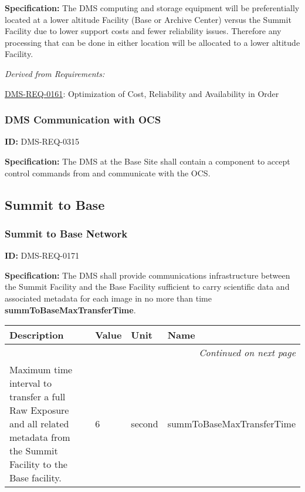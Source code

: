 \documentclass[SE,toc,lsstdraft]{lsstdoc}
\makeatletter
\newcommand{\paramname}[1]{\hspace{0pt}#1}
\newcommand{\unitname}[1]{\hspace{0pt}#1}
\newenvironment{parameters}[0]{%
\setlength\LTleft{0pt}
\setlength\LTright{\fill}
\begin{small}
\begin{longtable}[]{|p{0.5\textwidth}|l|p{0.6in}|p{1.74in}@{}|}

\hline \textbf{Description} & \textbf{Value} & \textbf{Unit} & \textbf{Name} \\ \hline
\endhead

\hline \multicolumn{4}{r}{\emph{Continued on next page}} \\
\endfoot

\hline\hline
\endlastfoot
}{%
\hline
\end{longtable}
\end{small}
}
\makeatother
\begin{document}
\textbf{Specification: }The DMS computing and storage equipment will be preferentially located at a lower altitude Facility (Base or Archive Center) versus the Summit Facility due to lower support costs and fewer reliability issues. Therefore any processing that can be done in either location will be allocated to a lower altitude Facility.






\emph{Derived from Requirements:}

\hyperref[DMS-REQ-0161]{DMS-REQ-0161}:
Optimization of Cost, Reliability and Availability in Order \newline


\subsubsection{DMS Communication with OCS}

\label{DMS-REQ-0315}
\textbf{ID:} DMS-REQ-0315

\textbf{Specification:} The DMS at the Base Site shall contain a component to accept control commands from and communicate with the OCS.






\subsection{Summit to Base}





\subsubsection{Summit to Base Network}

\label{DMS-REQ-0171}
\textbf{ID:} DMS-REQ-0171

\textbf{Specification:} The DMS shall provide communications infrastructure between the Summit Facility and the Base Facility sufficient to carry scientific data and associated metadata for each image in no more than time \textbf{summToBaseMaxTransferTime}.





\begin{parameters}
Maximum time interval to transfer a full Raw Exposure and all related metadata from the Summit Facility to the Base facility.
&
6
&
\unitname{%
second
}
&
\paramname{%
summToBaseMaxTransferTime
} \\\hline
\end{parameters}
\end{document}
